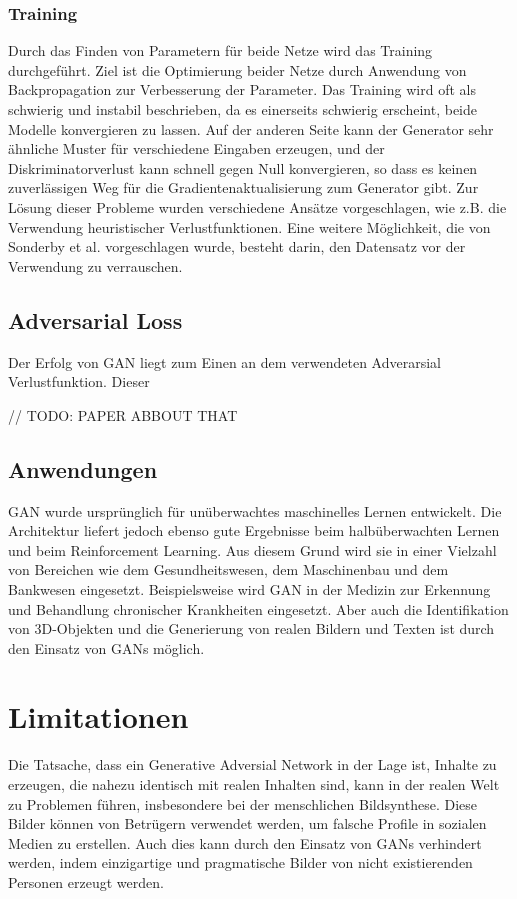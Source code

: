 \subsubsection*{Training}
Durch das Finden von Parametern für beide Netze wird das Training durchgeführt. Ziel ist die Optimierung beider Netze durch Anwendung von Backpropagation zur Verbesserung der Parameter. Das Training wird oft als schwierig und instabil beschrieben, da es einerseits schwierig erscheint, beide Modelle konvergieren zu lassen. Auf der anderen Seite kann der Generator sehr ähnliche Muster für verschiedene Eingaben erzeugen, und der Diskriminatorverlust kann schnell gegen Null konvergieren, so dass es keinen zuverlässigen Weg für die Gradientenaktualisierung zum Generator gibt. 
Zur Lösung dieser Probleme wurden verschiedene Ansätze vorgeschlagen, wie z.B. die Verwendung heuristischer Verlustfunktionen. Eine weitere Möglichkeit, die von Sonderby et al. vorgeschlagen wurde, besteht darin, den Datensatz vor der Verwendung zu verrauschen.

\subsection*{Adversarial Loss}
Der Erfolg von GAN liegt zum Einen an dem verwendeten Adverarsial Verlustfunktion. Dieser 

// TODO: PAPER ABBOUT THAT

\subsection*{Anwendungen}
GAN wurde ursprünglich für unüberwachtes maschinelles Lernen entwickelt. Die Architektur liefert jedoch ebenso gute Ergebnisse beim halbüberwachten Lernen und beim Reinforcement Learning. 
Aus diesem Grund wird sie in einer Vielzahl von Bereichen wie dem Gesundheitswesen, dem Maschinenbau und dem Bankwesen eingesetzt. Beispielsweise wird GAN in der Medizin zur Erkennung und Behandlung chronischer Krankheiten eingesetzt. Aber auch die Identifikation von 3D-Objekten und die Generierung von realen Bildern und Texten ist durch den Einsatz von GANs möglich.

\section*{Limitationen}
Die Tatsache, dass ein Generative Adversial Network in der Lage ist, Inhalte zu erzeugen, die nahezu identisch mit realen Inhalten sind, kann in der realen Welt zu Problemen führen, insbesondere bei der menschlichen Bildsynthese. Diese Bilder können von Betrügern verwendet werden, um falsche Profile in sozialen Medien zu erstellen. 
Auch dies kann durch den Einsatz von GANs verhindert werden, indem einzigartige und pragmatische Bilder von nicht existierenden Personen erzeugt werden.


